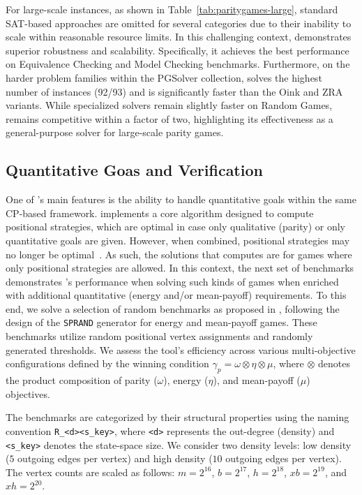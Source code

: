 \documentclass[runningheads]{llncs}
\begin{document}
For large-scale instances, as shown in Table~\ref{tab:paritygames-large}, standard SAT-based approaches are omitted for several categories due to their inability to scale within reasonable resource limits. In this challenging context, \nocq demonstrates superior robustness and scalability. Specifically, it achieves the best performance on Equivalence Checking and Model Checking benchmarks. Furthermore, on the harder problem families within the PGSolver collection, \nocq solves the highest number of instances (92/93) and is significantly faster than the Oink and ZRA variants. While specialized solvers remain slightly faster on Random Games, \nocq remains competitive within a factor of two, highlighting its effectiveness as a general-purpose solver for large-scale parity games.

\subsection{Quantitative Goas and Verification}

One of \nocq's main features is the ability to handle quantitative goals within the same CP-based framework. 
%
\nocq implements a core algorithm designed to compute positional strategies, which are optimal in case only qualitative (parity) or only quantitative goals are given. However, when combined, positional strategies may no longer be optimal~\cite{ChatterjeeHJ05,Chatterjee:2010}. As such, the solutions that \nocq computes are for games where only positional strategies are allowed. 
%
In this context, the next set of benchmarks demonstrates \nocq's performance when solving such kinds of games when enriched with additional quantitative (energy and/or mean-payoff) requirements.  
%
To this end, we solve a selection of random benchmarks as proposed in \cite{Chaloupka:2011}, following the design of the \texttt{SPRAND} generator \cite{CherkasskyBoris:1996} for energy and mean-payoff games. These benchmarks utilize random positional vertex assignments and randomly generated thresholds. We assess the tool's efficiency across various multi-objective configurations defined by the winning condition $\gamma_{p} = \omega \otimes \eta \otimes \mu$, where $\otimes$ denotes the product composition of parity ($\omega$), energy ($\eta$), and mean-payoff ($\mu$) objectives.

The benchmarks are categorized by their structural properties using the naming convention \texttt{R\_<d><s\_key>}, where \texttt{<d>} represents the out-degree (density) and \texttt{<s\_key>} denotes the state-space size. We consider two density levels: low density ($5$ outgoing edges per vertex) and high density ($10$ outgoing edges per vertex). The vertex counts are scaled as follows: $m = 2^{16}$, $b = 2^{17}$, $h = 2^{18}$, $xb = 2^{19}$, and $xh = 2^{20}$.
\end{document}
